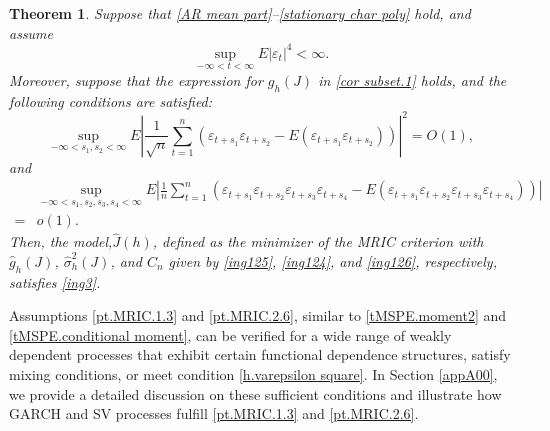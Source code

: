 \documentclass[ejsv2]{imsart}
\theoremstyle{plain}
\newtheorem{theorem}{Theorem}[section]
\theoremstyle{definition}
\theoremstyle{remark}
\begin{document}


\begin{theorem}\label{t MRIC}
Suppose that \eqref{AR mean part}--\eqref{stationary char poly} hold, and assume
\begin{equation}\label{tMRIC.moment}
\sup\limits_{-\infty<t<\infty}E|\varepsilon_t|^{4}<\infty.
\end{equation}
Moreover,
suppose that the expression for
$g_h(J)$ in \eqref{cor subset.1} holds,
and the following conditions are satisfied:
\begin{equation}\label{pt.MRIC.1.3}
\sup\limits_{-\infty<s_1,s_2<\infty}E|\frac{1}{\sqrt{n}}\sum_{t=1}^{n}(\varepsilon_{t+s_1}\varepsilon_{t+s_2}-E(\varepsilon_{t+s_1}\varepsilon_{t+s_2}))|^2= O(1),
\end{equation}
and 
\begin{equation}\label{pt.MRIC.2.6}
\begin{split}
&\sup\limits_{-\infty<s_1,s_2,s_3,s_4<\infty}E|\frac{1}{n}\sum_{t=1}^{n}(\varepsilon_{t+s_1}\varepsilon_{t+s_2}\varepsilon_{t+s_3}\varepsilon_{t+s_4}-E(\varepsilon_{t+s_1}\varepsilon_{t+s_2}\varepsilon_{t+s_3}\varepsilon_{t+s_4}))|\\
=&o(1).
\end{split}
\end{equation}
Then, the model,$\hat{J}(h)$,
defined as the minimizer of the MRIC criterion with
$\hat{g}_{h}(J)$,
$\hat{\sigma}^{2}_{h}(J)$, and $C_n$
given by
\eqref{ing125}, \eqref{ing124}, and
\eqref{ing126}, respectively,
satisfies
\eqref{ing3}. 
\end{theorem}

Assumptions \eqref{pt.MRIC.1.3} and \eqref{pt.MRIC.2.6}, similar to \eqref{tMSPE.moment2} and \eqref{tMSPE.conditional moment},
can be verified for
a wide range of weakly dependent processes
that exhibit certain functional dependence structures, satisfy mixing conditions, or meet condition \eqref{h.varepsilon square}.
In Section \ref{appA00}, we provide a detailed discussion on these sufficient conditions and illustrate how GARCH and SV processes fulfill \eqref{pt.MRIC.1.3} and \eqref{pt.MRIC.2.6}.
\end{document}
